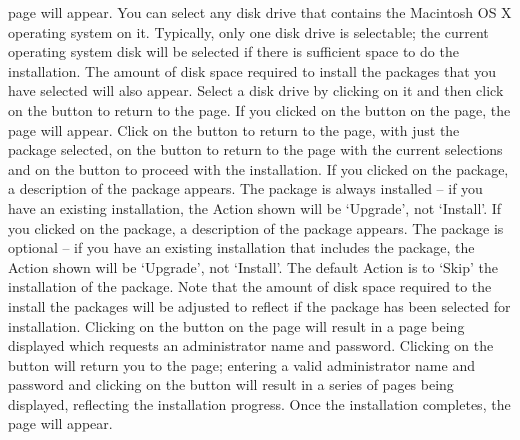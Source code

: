  page will appear.
You can select any disk drive that contains the Macintosh OS X operating system on it.
Typically, only one disk drive is selectable; the current operating system disk will be
selected if there is sufficient space to do the installation.
The amount of disk space required to install the packages that you have selected will also
appear.
Select a disk drive by clicking on it and then click on the  button
to return to the  page.
\newpage
If you clicked on the  button on the 
page, the  page will appear.
Click on the  button to return to the
 page, with just the  package selected, on the
 button to return to the  page with the
current selections and on the  button to proceed with the installation.
\newpage
If you clicked on the  package, a description of the package appears.
The  package is always installed -- if you have an existing \mplusm{}
installation, the Action shown will be `Upgrade', not `Install'.
\newpage
If you clicked on the  package, a description of the package appears.
The  package is optional -- if you have an existing \mplusm{}
installation that includes the  package, the Action shown will be
`Upgrade', not `Install'.
The default Action is to `Skip' the installation of the  package.
Note that the amount of disk space required to the install the packages will be adjusted
to reflect if the  package has been selected for installation.
\newpage
Clicking on the  button on the  page
will result in a page being displayed which requests an administrator name and password.
Clicking on the  button will return you to the
 page; entering a valid administrator name and password and
clicking on the  button will result in a series of pages
being displayed, reflecting the installation progress.
\newpage
Once the installation completes, the  page will appear.
